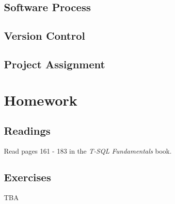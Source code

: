 \documentclass{article}
\begin{document}
        \subsection{Software Process}

        
        \subsection{Version Control}


        \subsection{Project Assignment}

    \section{Homework}


        \subsection{Readings}
        Read pages 161 - 183 in the \textit{T-SQL Fundamentals} book.
        
        \subsection{Exercises}
        TBA
\end{document}
